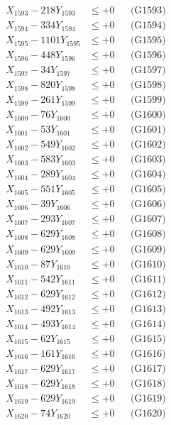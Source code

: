 \documentclass[a4paper,10pt]{article}
\begin{document}
{\begin{align}
X_{1593} - 218Y_{1593} &\leq +0 && \text{(G1593)} \\
X_{1594} - 334Y_{1594} &\leq +0 && \text{(G1594)} \\
X_{1595} - 1101Y_{1595} &\leq +0 && \text{(G1595)} \\
X_{1596} - 448Y_{1596} &\leq +0 && \text{(G1596)} \\
X_{1597} - 34Y_{1597} &\leq +0 && \text{(G1597)} \\
X_{1598} - 820Y_{1598} &\leq +0 && \text{(G1598)} \\
X_{1599} - 261Y_{1599} &\leq +0 && \text{(G1599)} \\
X_{1600} - 76Y_{1600} &\leq +0 && \text{(G1600)} \\
\allowbreak
X_{1601} - 53Y_{1601} &\leq +0 && \text{(G1601)} \\
X_{1602} - 549Y_{1602} &\leq +0 && \text{(G1602)} \\
X_{1603} - 583Y_{1603} &\leq +0 && \text{(G1603)} \\
X_{1604} - 289Y_{1604} &\leq +0 && \text{(G1604)} \\
X_{1605} - 551Y_{1605} &\leq +0 && \text{(G1605)} \\
X_{1606} - 39Y_{1606} &\leq +0 && \text{(G1606)} \\
X_{1607} - 293Y_{1607} &\leq +0 && \text{(G1607)} \\
X_{1608} - 629Y_{1608} &\leq +0 && \text{(G1608)} \\
X_{1609} - 629Y_{1609} &\leq +0 && \text{(G1609)} \\
X_{1610} - 87Y_{1610} &\leq +0 && \text{(G1610)} \\
\allowbreak
X_{1611} - 542Y_{1611} &\leq +0 && \text{(G1611)} \\
X_{1612} - 629Y_{1612} &\leq +0 && \text{(G1612)} \\
X_{1613} - 492Y_{1613} &\leq +0 && \text{(G1613)} \\
X_{1614} - 493Y_{1614} &\leq +0 && \text{(G1614)} \\
X_{1615} - 62Y_{1615} &\leq +0 && \text{(G1615)} \\
X_{1616} - 161Y_{1616} &\leq +0 && \text{(G1616)} \\
X_{1617} - 629Y_{1617} &\leq +0 && \text{(G1617)} \\
X_{1618} - 629Y_{1618} &\leq +0 && \text{(G1618)} \\
X_{1619} - 629Y_{1619} &\leq +0 && \text{(G1619)} \\
X_{1620} - 74Y_{1620} &\leq +0 && \text{(G1620)} \\

\end{align}}
\end{document}
